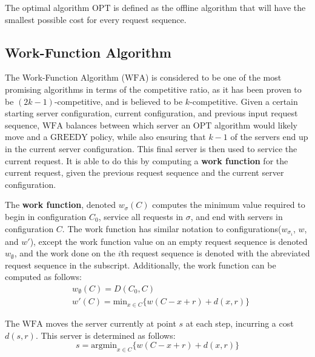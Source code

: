 \begin{definition}
    The optimal algorithm $\mathrm{OPT}$ is defined as the offline algorithm that will have the smallest possible cost for every request sequence.
\end{definition}

\subsection{Work-Function Algorithm}
\label{sec:WFA}
The Work-Function Algorithm ($\mathrm{WFA}$) is considered to be one of the most promising algorithms in terms of the competitive ratio, as it has been proven to be $(2k-1)$-competitive, and is believed to be $k$-competitive. Given a certain starting server configuration, current configuration, and previous input request sequence, $\mathrm{WFA}$ balances between which server an $\mathrm{OPT}$ algorithm would likely move and a $\mathrm{GREEDY}$ policy, while also ensuring that $k-1$ of the servers end up in the current server configuration. This final server is then used to service the current request. It is able to do this by computing a \textbf{work function} for the current request, given the previous request sequence and the current server configuration.

\begin{definition}
    The \textbf{work function}, denoted $w_\sigma(C)$ computes the minimum value required to begin in configuration $C_0$, service all requests in $\sigma$, and end with servers in configuration $C$. The work function has similar notation to configurations($w_{\sigma_i}$, $w$, and $w'$), except the work function value on an empty request sequence is denoted $w_\emptyset$, and the work done on the $i$th request sequence is denoted with the abreviated request sequence in the subscript. Additionally, the work function can be computed as follows:
    \begin{equation*}
        \begin{split}
            &w_\emptyset(C) = D(C_0, C) \\
            &w'(C) = \mathrm{min}_{x \in C} \{ w(C - x + r) + d(x, r)\}
        \end{split}
    \end{equation*}
\end{definition}

\begin{definition}
    The $\mathrm{WFA}$ moves the server currently at point $s$ at each step, incurring a cost $d(s,r)$. This server is determined as follows:
    \begin{equation*}
        s = \mathrm{argmin}_{x \in C} \{ w(C-x+r) + d(x,r)\}
    \end{equation*}
\end{definition}

